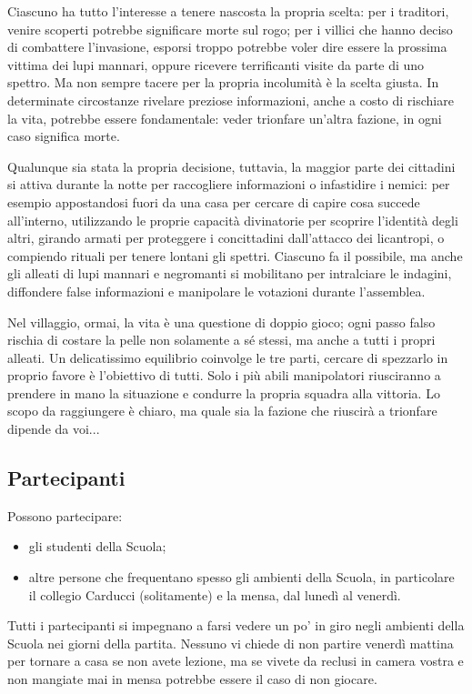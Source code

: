 \documentclass[a4paper,10pt]{article}
\begin{document}
Ciascuno ha tutto l'interesse a tenere nascosta la propria scelta: per i traditori, venire scoperti potrebbe significare morte sul rogo; per i villici che hanno deciso di combattere l'invasione, esporsi troppo potrebbe voler dire essere la prossima vittima dei lupi mannari, oppure ricevere terrificanti visite da parte di uno spettro. Ma non sempre tacere per la propria incolumità è la scelta giusta. In determinate circostanze rivelare preziose informazioni, anche a costo di rischiare la vita, potrebbe essere fondamentale: veder trionfare un'altra fazione, in ogni caso significa morte.

Qualunque sia stata la propria decisione, tuttavia, la maggior parte dei cittadini si attiva durante la notte per raccogliere informazioni o infastidire i nemici: per esempio appostandosi fuori da una casa per cercare di capire cosa succede all'interno, utilizzando le proprie capacità divinatorie per scoprire l'identità degli altri, girando armati per proteggere i concittadini dall'attacco dei licantropi, o compiendo rituali per tenere lontani gli spettri. Ciascuno fa il possibile, ma anche gli alleati di lupi mannari e negromanti si mobilitano per intralciare le indagini, diffondere false informazioni e manipolare le votazioni durante l'assemblea.

Nel villaggio, ormai, la vita è una questione di doppio gioco; ogni passo falso rischia di costare la pelle non solamente a sé stessi, ma anche a tutti i propri alleati. Un delicatissimo equilibrio coinvolge le tre parti, cercare di spezzarlo in proprio favore è l'obiettivo di tutti. Solo i più abili manipolatori riusciranno a prendere in mano la situazione e condurre la propria squadra alla vittoria. Lo scopo da raggiungere è chiaro, ma quale sia la fazione che riuscirà a trionfare dipende da voi...

\subsection{Partecipanti}

Possono partecipare:

\begin{itemize}
	\item gli studenti della Scuola;
	\item altre persone che frequentano spesso gli ambienti della Scuola, in particolare il collegio Carducci (solitamente) e la mensa, dal lunedì al venerdì.
\end{itemize}

Tutti i partecipanti si impegnano a farsi vedere un po' in giro negli ambienti della Scuola nei giorni della partita. Nessuno vi chiede di non partire venerdì mattina per tornare a casa se non avete lezione, ma se vivete da reclusi in camera vostra e non mangiate mai in mensa potrebbe essere il caso di non giocare.
\end{document}
